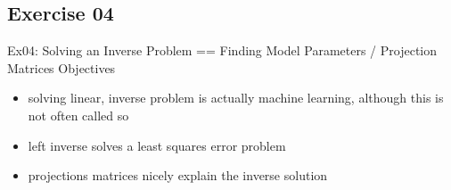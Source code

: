 \documentclass[mathserif, aspectratio=1610]{intbeamer}
\begin{document}

















\subsection{Exercise 04}

\begin{frame}{Ex04: Solving an Inverse Problem == Finding Model Parameters / Projection Matrices}
Objectives
\begin{itemize}
\item solving linear, inverse problem is actually machine learning, although this is not often called so
\item left inverse solves a least squares error problem
\item projections matrices nicely explain the inverse solution
\end{itemize}
\end{frame}
\end{document}
